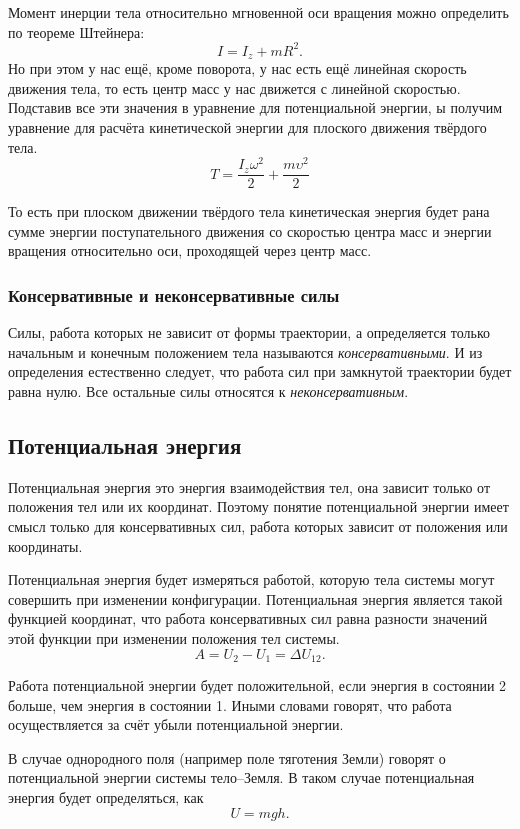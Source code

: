 Момент инерции тела относительно мгновенной оси вращения можно определить по
теореме Штейнера: \[
	I = I_z + mR^2
	.\] Но при этом у нас ещё, кроме поворота, у нас есть ещё линейная скорость
движения тела, то есть центр масс у нас движется с линейной скоростью. Подставив
все эти значения в уравнение для потенциальной энергии, ы получим уравнение для
расчёта кинетической энергии для плоского движения твёрдого тела.
\begin{equation}
	T = \frac{I_z \omega^2}{2} + \frac{m \upsilon^2}{2}
\end{equation}

То есть при плоском движении твёрдого тела кинетическая энергия будет рана
сумме энергии поступательного движения со скоростью центра масс и энергии
вращения относительно оси, проходящей через центр масс.

\subsubsection{Консервативные и неконсервативные силы}
Силы, работа которых не зависит от формы траектории, а определяется только
начальным и конечным положением тела называются \emph{консервативными}. И из
определения естественно следует, что работа сил при замкнутой траектории будет
равна нулю. Все остальные силы относятся к \emph{неконсервативным}.

\subsection{Потенциальная энергия}

Потенциальная энергия это энергия взаимодействия тел, она зависит только от
положения тел или их координат. Поэтому понятие потенциальной энергии имеет
смысл только для консервативных сил, работа которых зависит от положения или
координаты.

Потенциальная энергия будет измеряться работой, которую тела системы могут
совершить при изменении конфигурации. Потенциальная энергия является такой
функцией координат, что работа консервативных сил равна разности значений этой
функции при изменении положения тел системы.
\[
	A = U_2 - U_1 = \Delta U_{12}
	.\]

Работа потенциальной энергии будет положительной, если энергия в состоянии 2
больше, чем энергия в состоянии 1. Иными словами говорят, что работа
осуществляется за счёт убыли потенциальной энергии.

В случае однородного поля (например поле тяготения Земли) говорят о
потенциальной энергии системы тело--Земля. В таком случае потенциальная энергия
будет определяться, как \[
	U = m g h
	.\]

